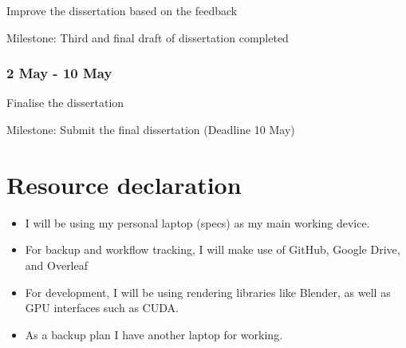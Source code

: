 \documentclass[12pt]{article}
\begin{document}
Improve the dissertation based on the feedback

Milestone: Third and final draft of dissertation completed

\subsubsection*{2 May - 10 May}

Finalise the dissertation

Milestone: Submit the final dissertation (Deadline 10 May)

\section{Resource declaration}

\begin{itemize}
\item I will be using my personal laptop (specs) as my main working device.
\item For backup and workflow tracking, I will make use of GitHub, Google Drive, and Overleaf
\item For development, I will be using rendering libraries like Blender, as well as GPU interfaces such as CUDA.
\item As a backup plan I have another laptop for working.
\end{itemize}



\end{document}
